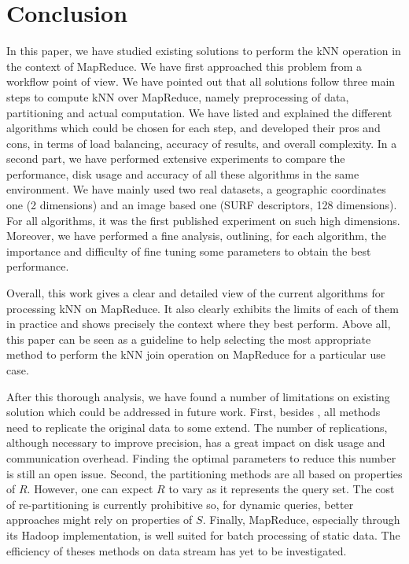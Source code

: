 \section{Conclusion}

In this paper, we have studied existing solutions to perform the kNN operation in the context of MapReduce. 
We have first approached this problem from a workflow 
point of view. We have pointed out that all solutions follow three main steps to compute kNN over MapReduce, namely 
preprocessing of data, partitioning and actual computation. We have listed and explained the different algorithms which could 
be chosen for each step, and developed their pros and cons, in terms of load 
balancing, accuracy of results, and overall complexity. 
In a second part, we have performed extensive experiments to compare the performance, disk 
usage and accuracy of all these algorithms in the same environment. We have mainly used two real datasets, a geographic
coordinates one (2 dimensions) and an image based one (SURF descriptors, 128 dimensions). For all algorithms,
it was the first published experiment on such high dimensions. Moreover, we have performed a fine analysis, 
outlining, for each algorithm, the importance and difficulty of fine tuning some parameters to obtain the best 
performance.

Overall, this work gives a clear and detailed view of the current algorithms for processing kNN on MapReduce. It also 
clearly exhibits the limits of each of them in practice and shows precisely the context where they best perform. Above 
all, this paper can be seen as a guideline to help 
selecting  the most appropriate method to perform the kNN join operation on MapReduce for a particular use case.

After this thorough analysis, we have found a number of limitations on existing solution which could be addressed 
in future work. First, besides 
\HBK, all methods need to replicate the original data to some extend. The number of replications, although
necessary to improve precision, has a great impact on  disk usage and  communication overhead. Finding the optimal
parameters to reduce this number is still an open issue. 
Second, the partitioning methods are all based on properties of $R$. However, one can expect $R$ to vary as it 
represents the query set. The cost of re-partitioning is currently prohibitive so, for dynamic queries, better 
approaches might rely on properties of $S$. Finally, MapReduce, especially through its Hadoop implementation, is well 
suited for
batch processing of static data. The efficiency of theses methods on data stream has yet to be investigated. 
%

